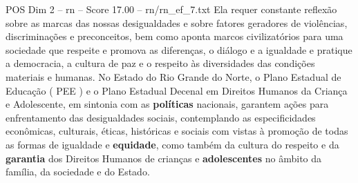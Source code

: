 \begin{textsample}{POS Dim 2 – rn – Score 17.00 – rn/rn\_ef\_7.txt}
Ela requer constante reflexão sobre as marcas das nossas desigualdades e sobre fatores geradores de violências, discriminações e preconceitos, bem como aponta marcos civilizatórios para uma sociedade que respeite e promova as diferenças, o diálogo e a igualdade e pratique a democracia, a cultura de paz e o respeito às diversidades das condições materiais e humanas.
No Estado do Rio Grande do Norte, o Plano Estadual de Educação ( PEE ) e o Plano Estadual Decenal em Direitos Humanos da Criança e Adolescente, em sintonia com as \textbf{políticas} nacionais, garantem ações para enfrentamento das desigualdades sociais, contemplando as especificidades econômicas, culturais, éticas, históricas e sociais com vistas à promoção de todas as formas de igualdade e \textbf{equidade}, como também da cultura do respeito e da \textbf{garantia} dos Direitos Humanos de crianças e \textbf{adolescentes} no âmbito da família, da sociedade e do Estado.

\end{textsample}
